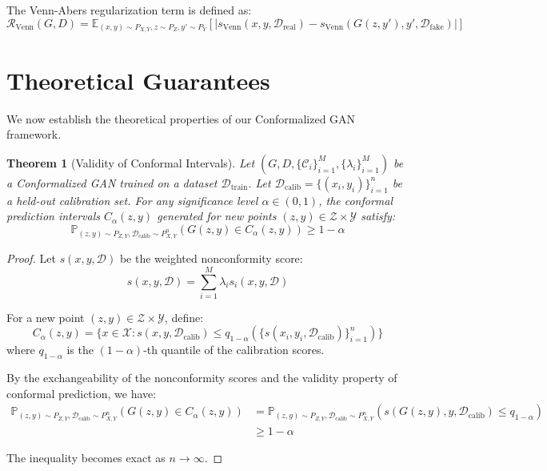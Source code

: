\documentclass{article}
\theoremstyle{plain}
\newtheorem{theorem}{Theorem}
\theoremstyle{definition}
\theoremstyle{remark}
\begin{document}
The Venn-Abers regularization term is defined as:
\begin{equation}
\mathcal{R}_{\text{Venn}}(G, D) = \mathbb{E}_{(x,y) \sim P_{X,Y}, z \sim P_Z, y' \sim P_Y}\left[|s_{\text{Venn}}(x, y, \mathcal{D}_{\text{real}}) - s_{\text{Venn}}(G(z, y'), y', \mathcal{D}_{\text{fake}})|\right]
\end{equation}

\section{Theoretical Guarantees}
We now establish the theoretical properties of our Conformalized GAN framework.

\begin{theorem}[Validity of Conformal Intervals]
Let $(G, D, \{\mathcal{C}_i\}_{i=1}^M, \{\lambda_i\}_{i=1}^M)$ be a Conformalized GAN trained on a dataset $\mathcal{D}_{\text{train}}$. Let $\mathcal{D}_{\text{calib}} = \{(x_i, y_i)\}_{i=1}^n$ be a held-out calibration set. For any significance level $\alpha \in (0, 1)$, the conformal prediction intervals $C_{\alpha}(z, y)$ generated for new points $(z, y) \in \mathcal{Z} \times \mathcal{Y}$ satisfy:
\begin{equation}
\mathbb{P}_{(z,y) \sim P_{Z,Y}, \mathcal{D}_{\text{calib}} \sim P_{X,Y}^n}\left(G(z, y) \in C_{\alpha}(z, y)\right) \geq 1 - \alpha
\end{equation}
\end{theorem}

\begin{proof}
Let $s(x, y, \mathcal{D})$ be the weighted nonconformity score:
\begin{equation}
s(x, y, \mathcal{D}) = \sum_{i=1}^M \lambda_i s_i(x, y, \mathcal{D})
\end{equation}

For a new point $(z, y) \in \mathcal{Z} \times \mathcal{Y}$, define:
\begin{equation}
C_{\alpha}(z, y) = \{x \in \mathcal{X}: s(x, y, \mathcal{D}_{\text{calib}}) \leq q_{1-\alpha}(\{s(x_i, y_i, \mathcal{D}_{\text{calib}})\}_{i=1}^n)\}
\end{equation}
where $q_{1-\alpha}$ is the $(1-\alpha)$-th quantile of the calibration scores.

By the exchangeability of the nonconformity scores and the validity property of conformal prediction, we have:
\begin{align}
\mathbb{P}_{(z,y) \sim P_{Z,Y}, \mathcal{D}_{\text{calib}} \sim P_{X,Y}^n}\left(G(z, y) \in C_{\alpha}(z, y)\right) &= \mathbb{P}_{(z,y) \sim P_{Z,Y}, \mathcal{D}_{\text{calib}} \sim P_{X,Y}^n}\left(s(G(z, y), y, \mathcal{D}_{\text{calib}}) \leq q_{1-\alpha}\right) \\
&\geq 1 - \alpha
\end{align}

The inequality becomes exact as $n \rightarrow \infty$.
\end{proof}
\end{document}
